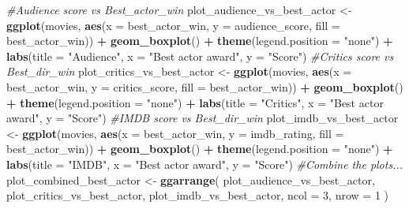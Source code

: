 \documentclass[]{article}
\newenvironment{Shaded}{\begin{snugshade}}{\end{snugshade}}
\newcommand{\KeywordTok}[1]{\textcolor[rgb]{0.13,0.29,0.53}{\textbf{#1}}}
\newcommand{\DataTypeTok}[1]{\textcolor[rgb]{0.13,0.29,0.53}{#1}}
\newcommand{\DecValTok}[1]{\textcolor[rgb]{0.00,0.00,0.81}{#1}}
\newcommand{\StringTok}[1]{\textcolor[rgb]{0.31,0.60,0.02}{#1}}
\newcommand{\CommentTok}[1]{\textcolor[rgb]{0.56,0.35,0.01}{\textit{#1}}}
\newcommand{\OperatorTok}[1]{\textcolor[rgb]{0.81,0.36,0.00}{\textbf{#1}}}
\newcommand{\NormalTok}[1]{#1}
\begin{document}
\begin{Shaded}
\begin{Highlighting}[]
\CommentTok{#Audience score vs Best_actor_win}
\NormalTok{plot_audience_vs_best_actor <-}
\StringTok{  }\KeywordTok{ggplot}\NormalTok{(movies,}
         \KeywordTok{aes}\NormalTok{(}\DataTypeTok{x =}\NormalTok{ best_actor_win, }\DataTypeTok{y =}\NormalTok{ audience_score, }\DataTypeTok{fill =}\NormalTok{ best_actor_win)) }\OperatorTok{+}
\StringTok{  }\KeywordTok{geom_boxplot}\NormalTok{() }\OperatorTok{+}\StringTok{ }\KeywordTok{theme}\NormalTok{(}\DataTypeTok{legend.position =} \StringTok{"none"}\NormalTok{) }\OperatorTok{+}\StringTok{ }\KeywordTok{labs}\NormalTok{(}\DataTypeTok{title =} \StringTok{"Audience"}\NormalTok{, }\DataTypeTok{x =} \StringTok{"Best actor award"}\NormalTok{, }\DataTypeTok{y =} \StringTok{"Score"}\NormalTok{)}
\CommentTok{#Critics score vs Best_dir_win}
\NormalTok{plot_critics_vs_best_actor <-}
\StringTok{  }\KeywordTok{ggplot}\NormalTok{(movies,}
         \KeywordTok{aes}\NormalTok{(}\DataTypeTok{x =}\NormalTok{ best_actor_win, }\DataTypeTok{y =}\NormalTok{ critics_score, }\DataTypeTok{fill =}\NormalTok{ best_actor_win)) }\OperatorTok{+}\StringTok{ }\KeywordTok{geom_boxplot}\NormalTok{() }\OperatorTok{+}\StringTok{ }\KeywordTok{theme}\NormalTok{(}\DataTypeTok{legend.position =} \StringTok{"none"}\NormalTok{) }\OperatorTok{+}\StringTok{ }\KeywordTok{labs}\NormalTok{(}\DataTypeTok{title =} \StringTok{"Critics"}\NormalTok{, }\DataTypeTok{x =} \StringTok{"Best actor award"}\NormalTok{, }\DataTypeTok{y =} \StringTok{"Score"}\NormalTok{)}
\CommentTok{#IMDB score vs Best_dir_win}
\NormalTok{plot_imdb_vs_best_actor <-}
\StringTok{  }\KeywordTok{ggplot}\NormalTok{(movies,}
         \KeywordTok{aes}\NormalTok{(}\DataTypeTok{x =}\NormalTok{ best_actor_win, }\DataTypeTok{y =}\NormalTok{ imdb_rating, }\DataTypeTok{fill =}\NormalTok{ best_actor_win)) }\OperatorTok{+}\StringTok{ }\KeywordTok{geom_boxplot}\NormalTok{() }\OperatorTok{+}\StringTok{ }\KeywordTok{theme}\NormalTok{(}\DataTypeTok{legend.position =} \StringTok{"none"}\NormalTok{) }\OperatorTok{+}\StringTok{ }\KeywordTok{labs}\NormalTok{(}\DataTypeTok{title =} \StringTok{"IMDB"}\NormalTok{, }\DataTypeTok{x =} \StringTok{"Best actor award"}\NormalTok{, }\DataTypeTok{y =} \StringTok{"Score"}\NormalTok{)}
\CommentTok{#Combine the plots...}
\NormalTok{plot_combined_best_actor <-}
\StringTok{  }\KeywordTok{ggarrange}\NormalTok{(}
\NormalTok{    plot_audience_vs_best_actor,}
\NormalTok{    plot_critics_vs_best_actor,}
\NormalTok{    plot_imdb_vs_best_actor,}
    \DataTypeTok{ncol =} \DecValTok{3}\NormalTok{,}
    \DataTypeTok{nrow =} \DecValTok{1}
\NormalTok{  )}


\end{Highlighting}
\end{Shaded}
\end{document}

